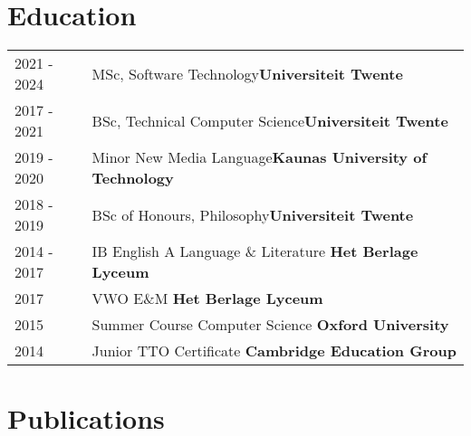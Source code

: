 \documentclass[a4paper,12pt]{article}
\begin{document}
\section{Education}
\begin{tabularx}{\linewidth}{@{}l X@{}}	
2021 - 2024 & MSc, Software Technology\hfill \textbf{Universiteit Twente} \\

2017 - 2021 & BSc, Technical Computer Science\hfill \textbf{Universiteit Twente} \\ 

2019 - 2020 & Minor New Media Language\hfill \textbf{Kaunas University of Technology} \\

2018 - 2019 & BSc of Honours, Philosophy\hfill \textbf{Universiteit Twente} \\

2014 - 2017 & IB English A Language \& Literature \hfill \textbf{Het Berlage Lyceum} \\

2017 & VWO E\&M \hfill \textbf{Het Berlage Lyceum} \\

2015 & Summer Course Computer Science \hfill \textbf{Oxford University} \\

2014 & Junior TTO Certificate \hfill \textbf{Cambridge Education Group} \\
\end{tabularx}

\section{Publications}
\begin{refsection}
\printbibliography[heading=none]
\end{refsection}

\end{document}
